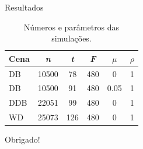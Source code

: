 \documentclass[aspectratio=169,xcolor=dvipsnames]{beamer}
\begin{document}
\begin{frame}{Resultados}
    
    \begin{table}[ht]
    \centering
    \begin{tabular}{|l|c|c|c|c|c|}
    \hline
    Cena & \textit{n} & \textit{t} & \textit{F} & $\mu$ & $\rho$ \\ \hline
    DB   & 10500      & 78         & 480        & 0     & 1      \\ \hline
    DB   & 10500      & 91         & 480        & 0.05  & 1      \\ \hline
    DDB  & 22051      & 99         & 480        & 0     & 1      \\ \hline
    WD   & 25073      & 126        & 480        & 0     & 1      \\ \hline
    \end{tabular}
    \caption{Números e parâmetros das simulações.}
    \label{tab:simparams}
    \end{table}
\end{frame}


\begin{frame}
    \Huge{\centerline{Obrigado!}}
\end{frame}

\end{document}
